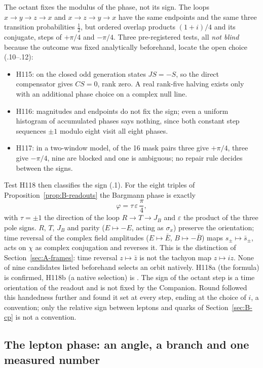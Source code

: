 The octant fixes the modulus of the phase, not its sign. The loops $x\to y\to z\to x$ and $x\to z\to y\to x$ have the same
endpoints and the same three transition probabilities $\tfrac12$, but ordered overlap products $(1+i)/4$ and its conjugate,
steps of $+\pi/4$ and $-\pi/4$. Three pre-registered tests, all \emph{not blind} because the outcome was fixed analytically
beforehand, locate the open choice (.10--.12):
\begin{itemize}
\item H115: on the closed odd generation states $JS=-S$, so the direct compensator gives $CS=0$, rank zero. A real rank-five
halving exists only with an additional phase choice on a complex null line.
\item H116: magnitudes and endpoints do not fix the sign; even a uniform histogram of accumulated phases says nothing, since
both constant step sequences $\pm1$ modulo eight visit all eight phases.
\item H117: in a two-window model, of the 16 mask pairs three give $+\pi/4$, three give $-\pi/4$, nine are blocked and one is
ambiguous; no repair rule decides between the signs.
\end{itemize}

Test H118 then classifies the sign (.1). For the eight triples of Proposition~\ref{prop:B-readouts} the Bargmann
phase is exactly
\begin{equation}
 \varphi=\tau\,\varepsilon\,\frac{\pi}{4},
 \label{eq:B-orientation}
\end{equation}
with $\tau=\pm1$ the direction of the loop $R\to T\to J_B$ and $\varepsilon$ the product of the three pole signs.
$R$, $T$, $J_B$ and parity ($E\mapsto-E$, acting as $\sigma_x$) preserve the orientation; time reversal of the complex field
amplitudes ($E\mapsto\bar E$, $B\mapsto-\bar B$) maps $s_\pm\mapsto\bar s_\pm$, acts on $\chi$ as complex conjugation and
reverses it. This is the distinction of Section~\ref{sec:A-frames}: time reversal $z\mapsto\bar z$ is not the tachyon map $z\mapsto iz$. None of
nine candidates listed beforehand selects an orbit natively. H118a (the formula) is confirmed, H118b (a native selection) is
\Refuted. The sign of the octant step is a time orientation of the readout and is not fixed by the Companion. Round
 followed this handedness further and found it set at every step, ending at the choice of $i$, a convention; only the
relative sign between leptons and quarks of Section~\ref{sec:B-cp} is not a convention.

\subsection{The lepton phase: an angle, a branch and one measured number}
\label{sec:B-lepton-phase}

